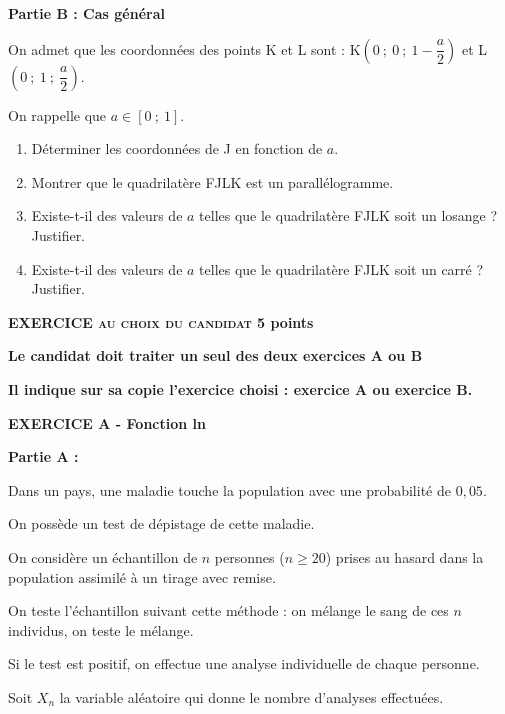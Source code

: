 \documentclass[11pt,a4paper]{article}
\begin{document}
\textbf{Partie B : Cas général}

\medskip

On admet que les coordonnées des points K et L sont : K$\left(0~;~0~;~1- \dfrac{a}{2}\right)$ et L$\left(0~;~1~;~\dfrac{a}{2}\right)$.

On rappelle que $a \in [0~;~1]$.

\medskip

\begin{enumerate}
\item Déterminer les coordonnées de J en fonction de $a$.
\item Montrer que le quadrilatère FJLK est un parallélogramme.
\item Existe-t-il des valeurs de $a$ telles que le quadrilatère FJLK soit un losange ? Justifier.
\item Existe-t-il des valeurs de $a$ telles que le quadrilatère FJLK soit un carré ? Justifier.
\end{enumerate}

\bigskip

\textbf{\textsc{EXERCICE au choix du candidat} \hfill 5 points}

\textbf{Le candidat doit traiter un seul des deux exercices A ou B}

\textbf{Il indique sur sa copie l'exercice choisi : exercice A ou exercice B.}

\medskip

\textbf{EXERCICE A - Fonction ln}

\bigskip

\textbf{Partie A :}

\medskip

Dans un pays, une maladie touche la population avec une probabilité de $0,05$.

On possède un test de dépistage de cette maladie.

On considère un échantillon de $n$ personnes ($n \geqslant 20$) prises au hasard dans la population assimilé à un tirage avec remise.

On teste l'échantillon suivant cette méthode : on mélange le sang de ces $n$ individus, on teste le mélange.

Si le test est positif, on effectue une analyse individuelle de chaque personne.

Soit $X_n$ la variable aléatoire qui donne le nombre d'analyses effectuées.

\medskip
\end{document}

